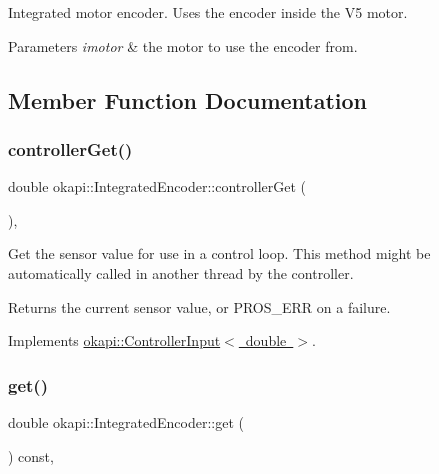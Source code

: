 Integrated motor encoder. Uses the encoder inside the V5 motor.


\begin{DoxyParams}{Parameters}
{\em imotor} & the motor to use the encoder from. \\
\hline
\end{DoxyParams}


\subsection{Member Function Documentation}
\mbox{\label{classokapi_1_1IntegratedEncoder_a5898ddc979b9cf2bcee0da3d440f28f8}} 
\subsubsection{\texorpdfstring{controllerGet()}{controllerGet()}}
{\footnotesize\ttfamily double okapi\+::\+Integrated\+Encoder\+::controller\+Get (\begin{DoxyParamCaption}{ }\end{DoxyParamCaption})\hspace{0.3cm}{\ttfamily [override]}, {\ttfamily [virtual]}}

Get the sensor value for use in a control loop. This method might be automatically called in another thread by the controller.

\begin{DoxyReturn}{Returns}
the current sensor value, or {\ttfamily P\+R\+O\+S\+\_\+\+E\+RR} on a failure. 
\end{DoxyReturn}


Implements \mbox{\hyperlink{classokapi_1_1ControllerInput_a3c6c86d897983f367928a93890551e17}{okapi\+::\+Controller\+Input$<$ double $>$}}.

\mbox{\label{classokapi_1_1IntegratedEncoder_af3fe091ddf4b7f36443a5616bfedc3cb}} 
\subsubsection{\texorpdfstring{get()}{get()}}
{\footnotesize\ttfamily double okapi\+::\+Integrated\+Encoder\+::get (\begin{DoxyParamCaption}{ }\end{DoxyParamCaption}) const\hspace{0.3cm}{\ttfamily [override]}, {\ttfamily [virtual]}}

